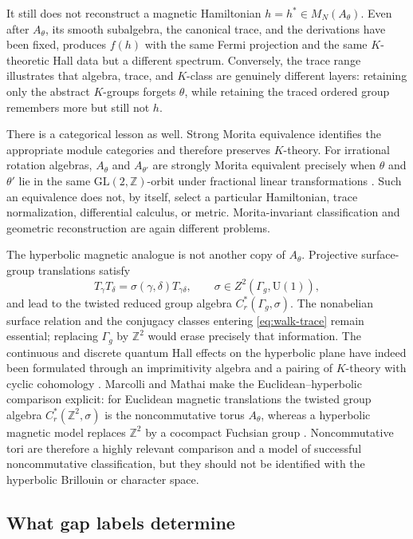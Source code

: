 \documentclass[11pt]{article}
\theoremstyle{definition}
\theoremstyle{remark}
\newcommand{\ZZ}{\mathbb Z}
\newcommand{\UU}{\mathrm U}
\begin{document}
It still does not reconstruct a magnetic Hamiltonian
\(h=h^*\in M_N(A_\theta)\).  Even after \(A_\theta\), its smooth subalgebra,
the canonical trace, and the derivations have been fixed,
 produces \(f(h)\) with the same Fermi
projection and the same \(K\)-theoretic Hall data but a different spectrum.
Conversely, the trace range illustrates that algebra, trace, and \(K\)-class
are genuinely different layers: retaining only the abstract \(K\)-groups
forgets \(\theta\), while retaining the traced ordered group remembers more
but still not \(h\).

There is a categorical lesson as well.  Strong Morita equivalence identifies
the appropriate module categories and therefore preserves \(K\)-theory.
For irrational rotation algebras, \(A_\theta\) and \(A_{\theta'}\) are
strongly Morita equivalent precisely when \(\theta\) and \(\theta'\) lie in
the same \(\mathrm{GL}(2,\ZZ)\)-orbit under fractional linear transformations
\cite{RieffelRotation1981}.  Such an equivalence does not, by itself, select a
particular Hamiltonian, trace normalization, differential calculus, or
metric.  Morita-invariant classification and geometric reconstruction are
again different problems.

The hyperbolic magnetic analogue is not another copy of \(A_\theta\).
Projective surface-group translations satisfy
\[
          T_\gamma T_\delta
             =\sigma(\gamma,\delta)T_{\gamma\delta},
       \qquad
          \sigma\in Z^2(\Gamma_g,\UU(1)),
\]
and lead to the twisted reduced group algebra
\(C_r^*(\Gamma_g,\sigma)\).  The nonabelian surface relation and the
conjugacy classes entering \eqref{eq:walk-trace} remain essential; replacing
\(\Gamma_g\) by \(\ZZ^2\) would erase precisely that information.  The
continuous and discrete quantum Hall effects on the hyperbolic plane have
indeed been formulated through an imprimitivity algebra and a pairing of
\(K\)-theory with cyclic cohomology
\cite{CareyHannabussMathaiMcCann1998}.  Marcolli and Mathai make the
Euclidean--hyperbolic comparison explicit: for Euclidean magnetic
translations the twisted group algebra
\(C_r^*(\ZZ^2,\sigma)\) is the noncommutative torus \(A_\theta\), whereas a
hyperbolic magnetic model replaces \(\ZZ^2\) by a cocompact Fuchsian group
\cite{MarcolliMathai2006}.  Noncommutative tori are therefore a highly
relevant comparison and a model of successful noncommutative
classification, but they should not be identified with the hyperbolic
Brillouin or character space.

\subsection{What gap labels determine}
\end{document}
